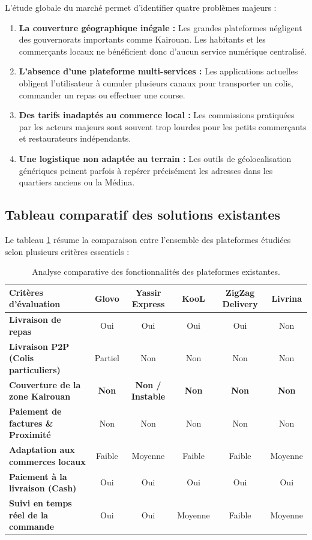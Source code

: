 \documentclass[12pt,fleqn,a4paper]{report}
\begin{document}
\begin{justify}
L'étude globale du marché permet d'identifier quatre problèmes majeurs :

\begin{enumerate}
    \item \textbf{La couverture géographique inégale :} Les grandes plateformes négligent des gouvernorats importants comme Kairouan. Les habitants et les commerçants locaux ne bénéficient donc d'aucun service numérique centralisé.
    \item \textbf{L'absence d'une plateforme multi-services :} Les applications actuelles obligent l'utilisateur à cumuler plusieurs canaux pour transporter un colis, commander un repas ou effectuer une course.
    \item \textbf{Des tarifs inadaptés au commerce local :} Les commissions pratiquées par les acteurs majeurs sont souvent trop lourdes pour les petits commerçants et restaurateurs indépendants.
    \item \textbf{Une logistique non adaptée au terrain :} Les outils de géolocalisation génériques peinent parfois à repérer précisément les adresses dans les quartiers anciens ou la Médina.
\end{enumerate}

\subsection{Tableau comparatif des solutions existantes}

Le tableau \ref{tab:comparatif_existant} résume la comparaison entre l'ensemble des plateformes étudiées selon plusieurs critères essentiels :

\begin{table}[h!]
\centering
\scriptsize
\setlength{\tabcolsep}{3pt}
\renewcommand{\arraystretch}{1.25}
\begin{tabular}{|l|c|c|c|c|c|}
\hline
\textbf{Critères d'évaluation} & \textbf{Glovo} & \textbf{Yassir Express} & \textbf{KooL} & \textbf{ZigZag Delivery} & \textbf{Livrina} \\ \hline
\textbf{Livraison de repas} & Oui & Oui & Oui & Oui & Non \\ \hline
\textbf{Livraison P2P (Colis particuliers)} & Partiel & Non & Non & Non & Non \\ \hline
\textbf{Couverture de la zone Kairouan} & \textbf{Non} & \textbf{Non / Instable} & \textbf{Non} & \textbf{Non} & \textbf{Non} \\ \hline
\textbf{Paiement de factures \& Proximité} & Non & Non & Non & Non & Non \\ \hline
\textbf{Adaptation aux commerces locaux} & Faible & Moyenne & Faible & Faible & Moyenne \\ \hline
\textbf{Paiement à la livraison (Cash)} & Oui & Oui & Oui & Oui & Oui \\ \hline
\textbf{Suivi en temps réel de la commande} & Oui & Oui & Moyenne & Faible & Moyenne \\ \hline
\end{tabular}
\caption{Analyse comparative des fonctionnalités des plateformes existantes.}
\label{tab:comparatif_existant}
\end{table}


\end{justify}
\end{document}
